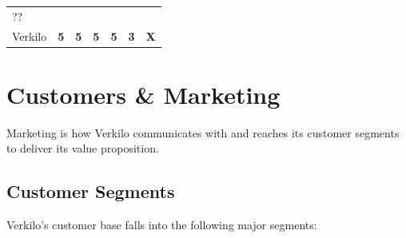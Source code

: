 \documentclass[10pt,openany]{book}
\begin{document}
\begin{longtable}[]{@{}lcccccc@{}}
\begin{minipage}[t]{0.10\columnwidth}
??\strut
\end{minipage}\tabularnewline
\begin{minipage}[t]{0.29\columnwidth}\raggedright
Verkilo\strut
\end{minipage} & \begin{minipage}[t]{0.09\columnwidth}\centering
\textbf{5}\strut
\end{minipage} & \begin{minipage}[t]{0.08\columnwidth}\centering
\textbf{5}\strut
\end{minipage} & \begin{minipage}[t]{0.09\columnwidth}\centering
\textbf{5}\strut
\end{minipage} & \begin{minipage}[t]{0.07\columnwidth}\centering
\textbf{5}\strut
\end{minipage} & \begin{minipage}[t]{0.10\columnwidth}\centering
\textbf{3}\strut
\end{minipage} & \begin{minipage}[t]{0.10\columnwidth}\centering
\textbf{X}\strut
\end{minipage}\tabularnewline
\bottomrule
\end{longtable}

\hypertarget{customers-marketing}{%
\chapter{Customers \& Marketing}\label{customers-marketing}}

Marketing is how Verkilo communicates with and reaches its customer
segments to deliver its value proposition.

\hypertarget{customer-segments}{%
\section{Customer Segments}\label{customer-segments}}

Verkilo's customer base falls into the following major segments:
\end{document}
